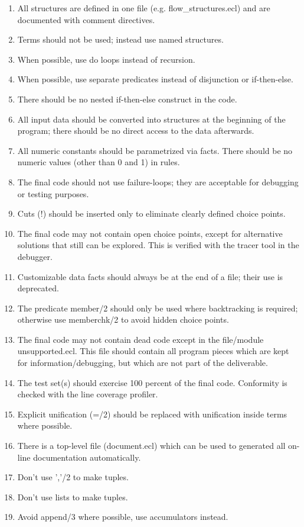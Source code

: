 \documentclass[a4paper,12pt]{report}
\begin{document}
\begin{enumerate}
\item  All structures are defined in one file (e.g. flow\_structures.ecl) and are documented with comment directives.
\item  Terms should not be used; instead use named structures.
\item  When possible, use do loops instead of recursion.
\item  When possible, use separate predicates instead of disjunction or if-then-else.
\item  There should be no nested if-then-else construct in the code.
\item  All input data should be converted into structures at the beginning of the program; there should be no direct access to the data afterwards. 
\item  All numeric constants should be parametrized via facts. There should be no numeric values (other than 0 and 1) in rules.
\item The final code should not use failure-loops; they are acceptable for debugging or testing purposes.
\item  Cuts (!)  should be inserted only to eliminate clearly defined choice points.
\item  The final code may not contain open choice points, except for alternative solutions that still can be explored. This is verified with the tracer tool in the debugger.
\item  Customizable data facts should always be at the end of a file; their use is deprecated.
\item  The predicate member/2 should only be used where backtracking is required; otherwise use memberchk/2 to avoid hidden choice points.
\item  The final code may not contain dead code except in the file/module unsupported.ecl. This file should contain all program pieces which are kept for information/debugging, but which are not part of the deliverable.
\item  The test set(s) should exercise 100 percent of the final code. Conformity is checked with the line coverage profiler.
\item  Explicit unification (=/2) should be replaced with unification inside terms where possible.
\item  There is a top-level file (document.ecl) which can be used to generated all on-line documentation automatically.
\item  Don't use ','/2 to make tuples.
\item  Don't use lists to make tuples.
\item  Avoid append/3 where possible, use accumulators instead.
\end{enumerate}
\end{document}
